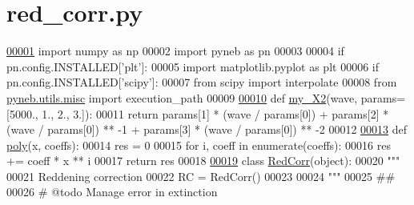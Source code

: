 \hypertarget{red__corr_8py_source}{}\section{red\+\_\+corr.\+py}
\label{red__corr_8py_source}

\begin{DoxyCode}
\hypertarget{red__corr_8py_source_l00001}{}\hyperlink{namespacepyneb_1_1extinction_1_1red__corr}{00001} \textcolor{keyword}{import} numpy \textcolor{keyword}{as} np
00002 \textcolor{keyword}{import} pyneb \textcolor{keyword}{as} pn
00003 
00004 \textcolor{keywordflow}{if} pn.config.INSTALLED[\textcolor{stringliteral}{'plt'}]:
00005     \textcolor{keyword}{import} matplotlib.pyplot \textcolor{keyword}{as} plt
00006 \textcolor{keywordflow}{if} pn.config.INSTALLED[\textcolor{stringliteral}{'scipy'}]:
00007     \textcolor{keyword}{from} scipy \textcolor{keyword}{import} interpolate
00008 \textcolor{keyword}{from} \hyperlink{namespacepyneb_1_1utils_1_1misc}{pyneb.utils.misc} \textcolor{keyword}{import} execution\_path
00009 
\hypertarget{red__corr_8py_source_l00010}{}\hyperlink{namespacepyneb_1_1extinction_1_1red__corr_a4859d2aec439b940a61931b8288c5ad9}{00010} \textcolor{keyword}{def }\hyperlink{namespacepyneb_1_1extinction_1_1red__corr_a4859d2aec439b940a61931b8288c5ad9}{my\_X2}(wave, params=[5000., 1., 2., 3.]):
00011     \textcolor{keywordflow}{return} params[1] * (wave / params[0]) + params[2] * (wave / params[0]) ** -1 + params[3] * (wave / 
      params[0]) ** -2
00012 
\hypertarget{red__corr_8py_source_l00013}{}\hyperlink{namespacepyneb_1_1extinction_1_1red__corr_a8a95d94679eeb72a22c8ee1c30748962}{00013} \textcolor{keyword}{def }\hyperlink{namespacepyneb_1_1extinction_1_1red__corr_a8a95d94679eeb72a22c8ee1c30748962}{poly}(x, coeffs):
00014     res = 0
00015     \textcolor{keywordflow}{for} i, coeff \textcolor{keywordflow}{in} enumerate(coeffs):
00016         res += coeff * x ** i
00017     \textcolor{keywordflow}{return} res
00018 
\hypertarget{red__corr_8py_source_l00019}{}\hyperlink{classpyneb_1_1extinction_1_1red__corr_1_1_red_corr}{00019} \textcolor{keyword}{class }\hyperlink{classpyneb_1_1extinction_1_1red__corr_1_1_red_corr}{RedCorr}(object):
00020     \textcolor{stringliteral}{"""}
00021 \textcolor{stringliteral}{    Reddening correction}
00022 \textcolor{stringliteral}{    RC = RedCorr()}
00023 \textcolor{stringliteral}{    }
00024 \textcolor{stringliteral}{    """}
00025     \textcolor{comment}{##}
00026     \textcolor{comment}{# @todo Manage error in extinction}

\end{DoxyCode}
